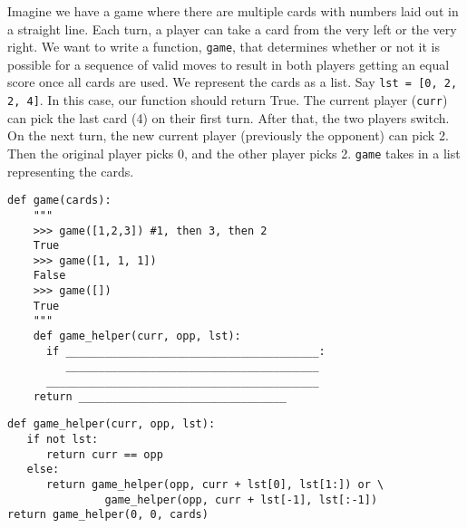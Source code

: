 \begin{blocksection}
\question Imagine we have a game where there are multiple cards with numbers laid out in a straight line. 
Each turn, a player can take a card from the very left or the very right. 
\newline
We want to write a function, \texttt{game}, that determines whether or not it is possible for a sequence of valid 
moves to result in both players getting an equal score once all cards are used.
\newline
We represent the cards as a list. Say \texttt{lst = [0, 2, 2, 4]}. In this case, our function should return True. 
The current player (\texttt{curr}) can pick the last card (4) on their first turn. After that, the two players switch. 
On the next turn, the new current player (previously the opponent) can pick 2. Then the original player picks 0, 
and the other player picks 2.
\newline
\texttt{game} takes in a list representing the cards.
\newline
\begin{lstlisting}
def game(cards):
    """
    >>> game([1,2,3]) #1, then 3, then 2
    True
    >>> game([1, 1, 1])
    False
    >>> game([])
    True
    """
    def game_helper(curr, opp, lst):
      if _______________________________________:
         _______________________________________
      __________________________________________
    return ________________________________
\end{lstlisting}

\begin{solution}
\begin{lstlisting}
def game_helper(curr, opp, lst):
   if not lst:
      return curr == opp
   else:
      return game_helper(opp, curr + lst[0], lst[1:]) or \
               game_helper(opp, curr + lst[-1], lst[:-1])
return game_helper(0, 0, cards)
\end{lstlisting}
\end{solution}
\end{blocksection}
